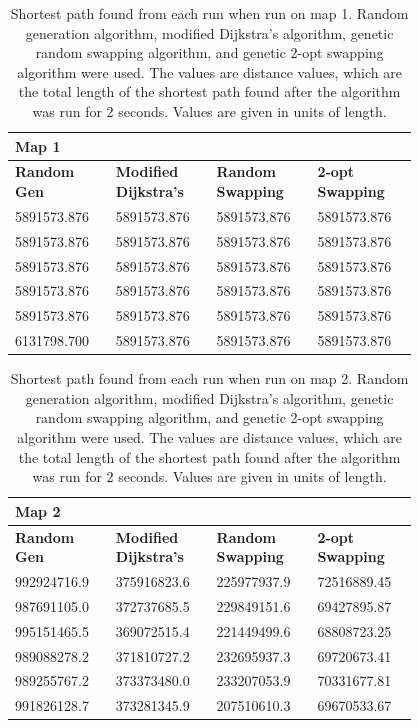 \documentclass{article}
\begin{document}
\begin{appendices}
\begin{table}[H]
    \caption{Shortest path found from each run when run on map 1. Random generation algorithm, modified Dijkstra's algorithm, genetic random swapping algorithm, and genetic 2-opt swapping algorithm were used. The values are distance values, which are the total length of the shortest path found after the algorithm was run for 2 seconds. Values are given in units of length.}\label{Table Map 1}
    \centering
    \begin{tabular}{|p{0.2\linewidth}|p{0.2\linewidth}|p{0.2\linewidth}|p{0.2\linewidth}|}
    \hline
        \textbf{Map 1} & ~ & ~ & ~ \\ \hline
        \textbf{Random Gen} & \textbf{Modified Dijkstra's} & \textbf{Random Swapping} & \textbf{2-opt Swapping} \\ \hline
        5891573.876 & 5891573.876 & 5891573.876 & 5891573.876 \\ \hline
        5891573.876 & 5891573.876 & 5891573.876 & 5891573.876 \\ \hline
        5891573.876 & 5891573.876 & 5891573.876 & 5891573.876 \\ \hline
        5891573.876 & 5891573.876 & 5891573.876 & 5891573.876 \\ \hline
        5891573.876 & 5891573.876 & 5891573.876 & 5891573.876 \\ \hline
        6131798.700 & 5891573.876 & 5891573.876 & 5891573.876 \\ \hline
    \end{tabular}
\end{table}

\begin{table}[H]
    \caption{Shortest path found from each run when run on map 2. Random generation algorithm, modified Dijkstra's algorithm, genetic random swapping algorithm, and genetic 2-opt swapping algorithm were used. The values are distance values, which are the total length of the shortest path found after the algorithm was run for 2 seconds. Values are given in units of length.}
    \centering
    \begin{tabular}{|p{0.2\linewidth}|p{0.2\linewidth}|p{0.2\linewidth}|p{0.2\linewidth}|}
    \hline
        \textbf{Map 2} & ~ & ~ & ~ \\ \hline
        \textbf{Random Gen} & \textbf{Modified Dijkstra's} & \textbf{Random Swapping} & \textbf{2-opt Swapping} \\ \hline
        992924716.9 & 375916823.6 & 225977937.9 & 72516889.45 \\ \hline
        987691105.0 & 372737685.5 & 229849151.6 & 69427895.87 \\ \hline
        995151465.5 & 369072515.4 & 221449499.6 & 68808723.25 \\ \hline
        989088278.2 & 371810727.2 & 232695937.3 & 69720673.41 \\ \hline
        989255767.2 & 373373480.0 & 233207053.9 & 70331677.81 \\ \hline
        991826128.7 & 373281345.9 & 207510610.3 & 69670533.67 \\ \hline
    \end{tabular}
\end{table}


\end{appendices}
\end{document}
